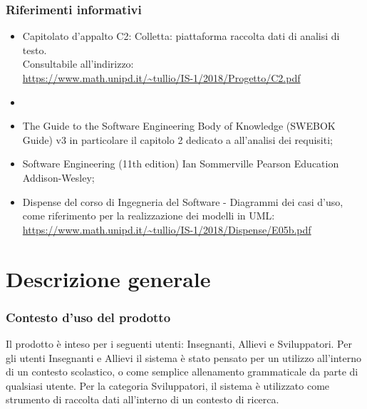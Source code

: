 \subsubsection{Riferimenti informativi}
\begin{itemize}
\item Capitolato d’appalto C2: Colletta: piattaforma raccolta dati di analisi di testo. \\ Consultabile all’indirizzo:\\
\url{https://www.math.unipd.it/~tullio/IS-1/2018/Progetto/C2.pdf}
\item \SdF
\item The Guide to the Software Engineering Body of Knowledge (SWEBOK Guide) v3 in particolare il capitolo 2 dedicato a all’analisi dei requisiti;
\item Software Engineering (11th edition) Ian Sommerville Pearson Education Addison-Wesley; 
\item Dispense del corso di Ingegneria del Software - Diagrammi dei casi d’uso, come riferimento per la realizzazione dei modelli in UML:\\
\url{https://www.math.unipd.it/~tullio/IS-1/2018/Dispense/E05b.pdf}
\end{itemize}
\newpage
\section{Descrizione generale}
\subsubsection{Contesto d’uso del prodotto}
Il prodotto è inteso per i seguenti utenti: Insegnanti, Allievi e Sviluppatori. Per gli utenti Insegnanti e Allievi il sistema è stato pensato per un utilizzo all’interno di un contesto scolastico, o come semplice allenamento grammaticale da parte di qualsiasi utente. Per la categoria Sviluppatori, il sistema è utilizzato come strumento di raccolta dati all'interno di un contesto di ricerca.
